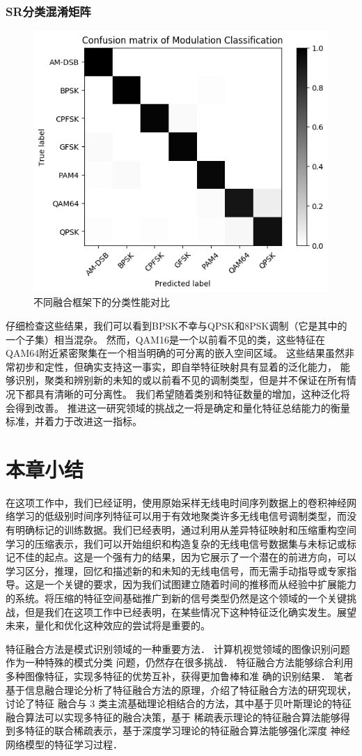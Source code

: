 \subsubsection{SR分类混淆矩阵}
\begin{figure}[!h]
	\centering
	\includegraphics[scale=0.7]{figures/chapter_4/fig_4_8}
	\caption{不同融合框架下的分类性能对比}\label{sec:fig_4_8}
\end{figure}
仔细检查这些结果，我们可以看到BPSK不幸与QPSK和8PSK调制（它是其中的一个子集）相当混杂。
然而，QAM16是一个以前看不见的类，这些特征在QAM64附近紧密聚集在一个相当明确的可分离的嵌入空间区域。
这些结果虽然非常初步和定性，但确实支持这一事实，即自举特征映射具有显着的泛化能力，
能够识别，聚类和辨别新的未知的或以前看不见的调制类型，但是并不保证在所有情况下都具有清晰的可分离性。
我们希望随着类别和特征数量的增加，这种泛化将会得到改善。
推进这一研究领域的挑战之一将是确定和量化特征总结能力的衡量标准，并着力于改进这一指标。\par

\section{本章小结}
在这项工作中，我们已经证明，使用原始采样无线电时间序列数据上的卷积神经网络学习的低级别时间序列特征可以用于有效地聚类许多无线电信号调制类型，而没有明确标记的训练数据。我们已经表明，通过利用从差异特征映射和压缩重构空间学习的压缩表示，我们可以开始组织和构造复杂的无线电信号数据集与未标记或标记不佳的起点。这是一个强有力的结果，因为它展示了一个潜在的前进方向，可以学习区分，推理，回忆和描述新的和未知的无线电信号，而无需手动指导或专家指导。这是一个关键的要求，因为我们试图建立随着时间的推移而从经验中扩展能力的系统。将压缩的特征空间基础推广到新的信号类型仍然是这个领域的一个关键挑战，但是我们在这项工作中已经表明，在某些情况下这种特征泛化确实发生。展望未来，量化和优化这种效应的尝试将是重要的。\par

特征融合方法是模式识别领域的一种重要方法． 计算机视觉领域的图像识别问题作为一种特殊的模式分类
问题，仍然存在很多挑战． 特征融合方法能够综合利用多种图像特征，实现多特征的优势互补，获得更加鲁棒和准
确的识别结果． 笔者基于信息融合理论分析了特征融合方法的原理，介绍了特征融合方法的研究现状，讨论了特征
融合与 3 类主流基础理论相结合的方法，其中基于贝叶斯理论的特征融合算法可以实现多特征的融合决策，基于
稀疏表示理论的特征融合算法能够得到多特征的联合稀疏表示，基于深度学习理论的特征融合算法能够强化深度
神经网络模型的特征学习过程．\par
